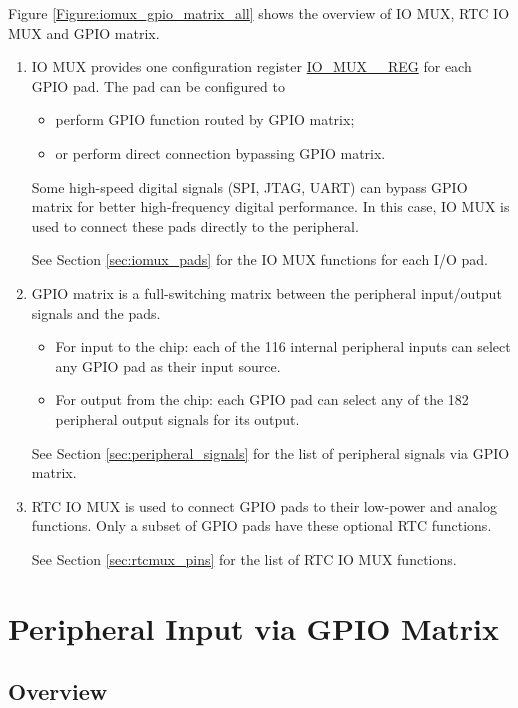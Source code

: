 \documentclass[main\_\_EN.tex]{subfiles}
\begin{document}
Figure \ref{Figure:iomux_gpio_matrix_all} shows the overview of IO MUX, RTC IO MUX and GPIO matrix.

\begin{enumerate}

\item IO MUX provides one configuration register \hyperref[regdesc:IOMUXnREG]{IO\_MUX\_\_REG} for each GPIO pad. The pad can be configured to
    \begin{itemize}
        \item perform GPIO function routed by GPIO matrix;
        \item or perform direct connection bypassing GPIO matrix.
    \end{itemize}
Some high-speed digital signals (SPI, JTAG, UART) can bypass GPIO matrix for better high-frequency digital performance. In this case, IO MUX is used to connect these pads directly to the peripheral.

See Section \ref{sec:iomux_pads} for the IO MUX functions for each I/O pad.

\item GPIO matrix is a full-switching matrix between the peripheral input/output signals and the pads.
\begin{itemize}
\item For input to the chip: each of the 116 internal peripheral inputs can select any GPIO pad as their input source.
\item For output from the chip: each GPIO pad can select any of the 182 peripheral output signals for its output.
\end{itemize}

See Section \ref{sec:peripheral_signals} for the list of peripheral signals via GPIO matrix.

\item RTC IO MUX is used to connect GPIO pads to their low-power and analog functions. Only a subset of GPIO pads have these optional RTC functions.

See Section \ref{sec:rtcmux_pins} for the list of RTC IO MUX functions.
\end{enumerate}

\section{Peripheral Input via GPIO Matrix}


\subsection{Overview}
\end{document}
